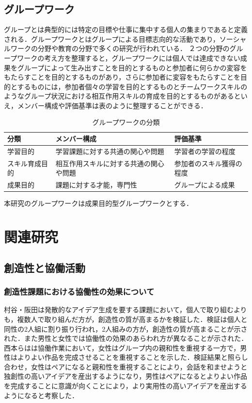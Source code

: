 \documentclass{funthesis}
\begin{document}
\section{グループワーク}
グループとは典型的には特定の目標や仕事に集中する個人の集まりであると定義される．グループワークとはグループによる目標志向的な活動であり，ソーシャルワークの分野や教育の分野で多くの研究が行われている\cite{A13}．
２つの分野のグループワークの考え方を整理すると，グループワークには個人では達成できない成果をグループによって生み出すことを目的とするものと参加者に何らかの変容をもたらすことを目的とするものがあり，さらに参加者に変容をもたらすことを目的とするものには，参加者個々の学習を目的とするものとチームワークスキルのようなグループ状況における相互作用スキルの育成を目的とするものがあるといえ，メンバー構成や評価基準は表のように整理することができる．\cite{A13}
\begin{table}[h]
\begin{center}
  \caption{グループワークの分類}
  \begin{tabular}{lll} \hline
    分類& メンバー構成&評価基準\tabularnewline \hline
    学習目的& 学習課題に対する共通の関心や問題 & 
    学習者の学習の程度\tabularnewline
    スキル育成目的&相互作用スキルに対する共通の関心や問題& 
    参加者のスキル獲得の程度\tabularnewline
    成果目的&課題に対する才能，専門性&
    グループによる成果\tabularnewline
    \hline
  \end{tabular}
  \label{groupwork}
  \end{center}
\end{table}

本研究のグループワークは成果目的型グループワークとする．



\chapter{関連研究}

\section{創造性と協働活動}

\subsection{創造性課題における協働性の効果について} %
村谷・阪田\cite{A10}は発散的なアイデア生成を要する課題において，個人で取り組むよりも，複数人で取り組んだ方が，創造性の質が高まるかを検証した．検証は個人と同性の2人組に割り振り行われ，2人組みの方が，創造性の質が高まることが示された．また男性と女性では協働性の効果のあらわれ方が異なることが示された．西本らは\cite{A11}は協働作業において，女性はグループ内の親和性を重視する一方で，男性はよりよい作品を完成させることを重視することを示した．検証結果と照らし合わせ，女性はペアになると親和性を重視することにより，会話を和ませようと独創性の高いアイデアを産出するようになり，男性はペアになるとよりよい作品を完成することに意識が向くことにより，より実用性の高いアイデアを産出するようになると考察した．
\end{document}
